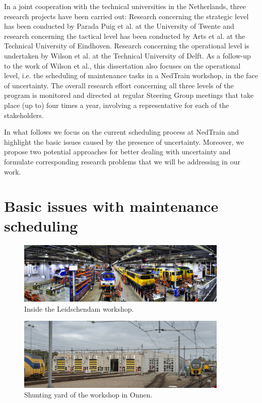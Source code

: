 	In a joint cooperation with the technical universities in the Netherlands, 
	three research projects have been carried out:
	Research concerning the strategic level has been conducted by Parada Puig et al. \cite{parada:2015} at the University of Twente and
	research concerning the tactical level has been conducted by Arts et al. \cite{arts2013spare} at the Technical University of Eindhoven.
	Research concerning the operational level is undertaken by Wilson et al. \cite{wilson:2016} at the Technical University of Delft.
	As a follow-up to the work of Wilson et al., this dissertation also focuses on the operational level,
	i.e. the scheduling of maintenance tasks in a NedTrain workshop, in the face of uncertainty.		
	The overall research effort concerning all three levels of the program 
	is monitored and directed at regular Steering Group meetings
	that take place (up to) four times a year, involving a representative for each of the stakeholders.
	
	In what follows we focus on the current scheduling process at NedTrain
	and highlight the basic issues caused by the presence of uncertainty.
	Moreover, we propose two potential approaches for better dealing  with uncertainty
	and formulate corresponding research problems that we will be addressing in our work.

\section{Basic issues with maintenance scheduling}
		\begin{figure}
			\centering
			\includegraphics[width=0.9\textwidth]{chapter/introduction/workshop-1}
			\caption{Inside the Leidschendam workshop.}
			\label{fig-workshop-1}
		\end{figure}

		\begin{figure}
			\centering
			\includegraphics[width=0.9\textwidth]{chapter/introduction/workshop-3}
			\caption{Shunting yard of the workshop in Onnen.}
			\label{fig-workshop-2}
		\end{figure}

